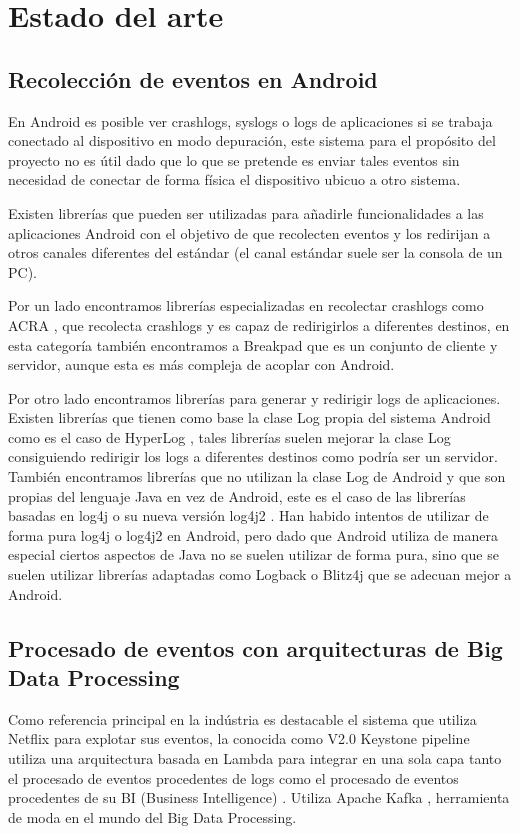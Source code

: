 \section{Estado del arte}

\subsection{Recolección de eventos en Android}
En Android es posible ver crashlogs, syslogs o logs de aplicaciones si se trabaja conectado al dispositivo en modo depuración, este sistema para el propósito del proyecto no es útil dado que lo que se pretende es enviar tales eventos sin necesidad de conectar de forma física el dispositivo ubicuo a otro sistema. 

Existen librerías que pueden ser utilizadas para añadirle funcionalidades a las aplicaciones Android con el objetivo de que recolecten eventos y los redirijan a otros canales diferentes del estándar (el canal estándar suele ser la consola de un PC). 

Por un lado encontramos librerías especializadas en recolectar crashlogs como ACRA \cite{Tfg:acra}, que recolecta crashlogs y es capaz de redirigirlos a diferentes destinos, en esta categoría también encontramos a Breakpad \cite{Tfg:breakpad} que es un conjunto de cliente y servidor, aunque esta es más compleja de acoplar con Android.

Por otro lado encontramos librerías para generar y redirigir logs de aplicaciones. Existen librerías que tienen como base la clase Log \cite{Tfg:logclass} propia del sistema Android como es el caso de HyperLog \cite{Tfg:hyperlog}, tales librerías suelen mejorar la clase Log consiguiendo redirigir los logs a diferentes destinos como podría ser un servidor. También encontramos librerías que no utilizan la clase Log de Android y que son propias del lenguaje Java en vez de Android, este es el caso de las librerías basadas en log4j o su nueva versión log4j2 \cite{Tfg:log4j2}. Han habido intentos de utilizar de forma pura log4j o log4j2 en Android, pero dado que Android utiliza de manera especial ciertos aspectos de Java no se suelen utilizar de forma pura, sino que se suelen utilizar librerías adaptadas como Logback \cite{Tfg:logback} o Blitz4j \cite{Tfg:blitz4j} que se adecuan mejor a Android.

\subsection{Procesado de eventos con arquitecturas de Big Data Processing}\label{cap:procesadoBigData}
Como referencia principal en la indústria es destacable el sistema que utiliza Netflix para explotar sus eventos, la conocida como V2.0 Keystone pipeline \cite{Tfg:netflixpipe} utiliza una arquitectura basada en Lambda para integrar en una sola capa tanto el procesado de eventos procedentes de logs como el procesado de eventos procedentes de su BI (Business Intelligence) \cite{Tfg:bi}. Utiliza Apache Kafka \cite{Tfg:kafka}, herramienta de moda en el mundo del Big Data Processing.

